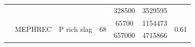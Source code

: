 \documentclass[authoryear]{elsarticle}
\begin{document}
\begin{table}[h]
{\begin{tabular}{@{}ccccccc@{}}
			&         &            &                                                                                     & 328500                                                         & 3529595                                                     &                                    \\
			& \multirow{2}{*}{MEPHREC}           & \multirow{2}{*}{P rich slag}                & \multirow{2}{*}{68}                                                                                    & 65700                                                          & 1154473                                                     & \multirow{2}{*}{0.61} \\
			&            &                &                                                                                     & 657000                                                         & 4715866                                                     &                                    \\ \bottomrule
		\end{tabular}
	}
\end{table}
\end{document}
